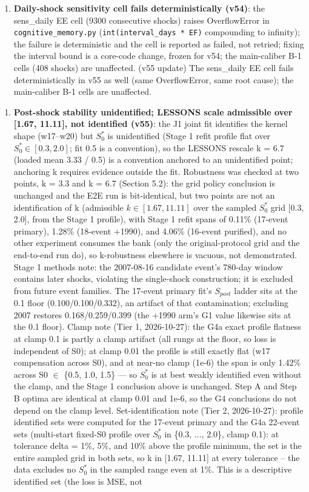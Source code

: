 \documentclass[11pt]{article}
\begin{document}
\begin{enumerate}
\item \textbf{Daily-shock sensitivity cell fails deterministically (v54)}: the sens\_daily EE cell (9300 consecutive shocks) raises OverflowError in \texttt{cognitive\_memory.py} (\texttt{int(interval\_days * EF)} compounding to infinity); the failure is deterministic and the cell is reported as failed, not retried; fixing the interval bound is a core-code change, frozen for v54; the main-caliber B-1 cells (408 shocks) are unaffected. (v55 update) The sens\_daily EE cell fails deterministically in v55 as well (same OverflowError, same root cause); the main-caliber B-1 cells are unaffected.
\end{enumerate}

\begin{enumerate}
\item \textbf{Post-shock stability unidentified; LESSONS scale admissible over [1.67, 11.11], not identified (v55)}: the J1 joint fit identifies the kernel shape (w17--w20) but $S_0^*$ is unidentified (Stage 1 refit profile flat over $S_0^* \in [0.3, 2.0]$; fit 0.5 is a convention), so the LESSONS rescale k = 6.7 (loaded mean 3.33 / 0.5) is a convention anchored to an unidentified point; anchoring k requires evidence outside the fit. Robustness was checked at two points, k = 3.3 and k = 6.7 (Section 5.2): the grid policy conclusion is unchanged and the E2E run is bit-identical, but two points are not an identification of k (admissible $k \in [1.67, 11.11]$ over the sampled $S_0^*$ grid [0.3, 2.0], from the Stage 1 profile), with Stage 1 refit spans of 0.11\% (17-event primary), 1.28\% (18-event +1990), and 4.06\% (16-event purified), and no other experiment consumes the bank (only the original-protocol grid and the end-to-end run do), so k-robustness elsewhere is vacuous, not demonstrated. Stage 1 methods note: the 2007-08-16 candidate event's 780-day window contains later shocks, violating the single-shock construction; it is excluded from future event families. The 17-event primary fit's $S_{post}$ ladder sits at the 0.1 floor (0.100/0.100/0.332), an artifact of that contamination; excluding 2007 restores 0.168/0.259/0.399 (the +1990 arm's G1 value likewise sits at the 0.1 floor). Clamp note (Tier 1, 2026-10-27): the G4a exact profile flatness at clamp 0.1 is partly a clamp artifact (all rungs at the floor, so loss is independent of S0); at clamp 0.01 the profile is still exactly flat (w17 compensation across S0), and at near-no clamp (1e-6) the span is only 1.42\% across S0 $\in$ \{0.5, 1.0, 1.5\} --- so $S_0^*$ is at best weakly identified even without the clamp, and the Stage 1 conclusion above is unchanged. Step A and Step B optima are identical at clamp 0.01 and 1e-6, so the G4 conclusions do not depend on the clamp level. Set-identification note (Tier 2, 2026-10-27): profile identified sets were computed for the 17-event primary and the G4a 22-event sets (multi-start fixed-S0 profile over $S_0^*$ in \{0.3, ..., 2.0\}, clamp 0.1): at tolerance delta = 1\%, 5\%, and 10\% above the profile minimum, the set is the entire sampled grid in both sets, so k in [1.67, 11.11] at every tolerance -- the data excludes no $S_0^*$ in the sampled range even at 1\%. This is a descriptive identified set (the loss is MSE, not 
\end{enumerate}
\end{document}
